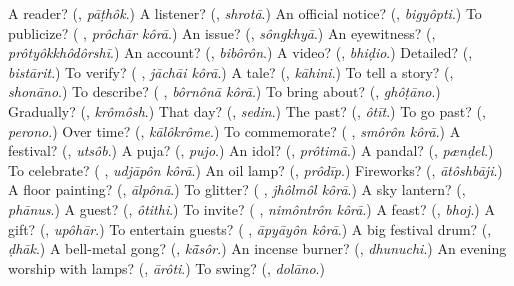 \begin{tcolorbox}[breakable,colback=teal!4,colframe=teal!35!black,title={Before you move on}]
A reader? (\textbf{}, \emph{pāṭhôk}.) A listener? (\textbf{}, \emph{shrotā}.) An official notice? (\textbf{}, \emph{bigyôpti}.) To publicize? (\textbf{ }, \emph{prôchār kôrā}.) An issue? (\textbf{}, \emph{sôngkhyā}.) An eyewitness? (\textbf{}, \emph{prôtyôkkhôdôrshī}.) An account? (\textbf{}, \emph{bibôrôn}.) A video? (\textbf{}, \emph{bhiḍio}.) Detailed? (\textbf{}, \emph{bistārit}.) To verify? (\textbf{ }, \emph{jāchāi kôrā}.) A tale? (\textbf{}, \emph{kāhini}.) To tell a story? (\textbf{}, \emph{shonāno}.) To describe? (\textbf{ }, \emph{bôrnônā kôrā}.) To bring about? (\textbf{}, \emph{ghôṭāno}.) Gradually? (\textbf{}, \emph{krômôsh}.) That day? (\textbf{}, \emph{sedin}.) The past? (\textbf{}, \emph{ôtīt}.) To go past? (\textbf{}, \emph{perono}.) Over time? (\textbf{}, \emph{kālôkrôme}.) To commemorate? (\textbf{ }, \emph{smôrôn kôrā}.) A festival? (\textbf{}, \emph{utsôb}.) A puja? (\textbf{}, \emph{pujo}.) An idol? (\textbf{}, \emph{prôtimā}.) A pandal? (\textbf{}, \emph{pænḍel}.) To celebrate? (\textbf{ }, \emph{udjāpôn kôrā}.) An oil lamp? (\textbf{}, \emph{prôdīp}.) Fireworks? (\textbf{}, \emph{ātôshbāji}.) A floor painting? (\textbf{}, \emph{ālpônā}.) To glitter? (\textbf{ }, \emph{jhôlmôl kôrā}.) A sky lantern? (\textbf{}, \emph{phānus}.) A guest? (\textbf{}, \emph{ôtithi}.) To invite? (\textbf{ }, \emph{nimôntrôn kôrā}.) A feast? (\textbf{}, \emph{bhoj}.) A gift? (\textbf{}, \emph{upôhār}.) To entertain guests? (\textbf{ }, \emph{āpyāyôn kôrā}.) A big festival drum? (\textbf{}, \emph{ḍhāk}.) A bell-metal gong? (\textbf{}, \emph{kā̃sôr}.) An incense burner? (\textbf{}, \emph{dhunuchi}.) An evening worship with lamps? (\textbf{}, \emph{ārôti}.) To swing? (\textbf{}, \emph{dolāno}.)
\end{tcolorbox}

